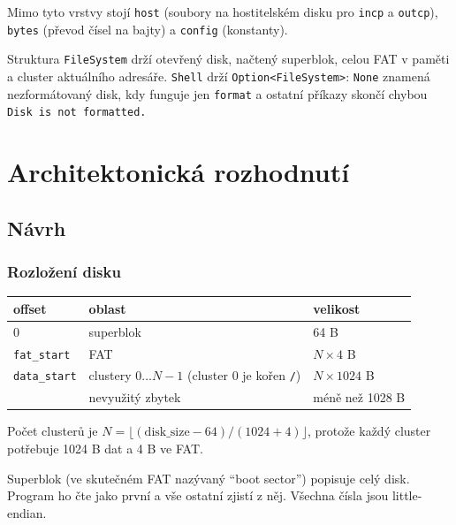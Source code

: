 \documentclass[10pt, a4paper]{report}
\newcommand{\code}[1]{\texttt{#1}}
\begin{document}
	Mimo tyto vrstvy stojí \code{host} (soubory na hostitelském disku pro \code{incp} a
	\code{outcp}), \code{bytes} (převod čísel na bajty) a \code{config} (konstanty).
	
	Struktura \code{FileSystem} drží otevřený disk, načtený superblok, celou FAT v paměti a cluster
	aktuálního adresáře. \code{Shell} drží \code{Option<FileSystem>}: \code{None} znamená
	nezformátovaný disk, kdy funguje jen \code{format} a ostatní příkazy skončí chybou
	\code{Disk is not formatted.}
	
	\chapter{Architektonická rozhodnutí}
	
	\section{Návrh}
	
	\subsection{Rozložení disku}
	
	\begin{table}[H]
		\centering
		\begin{tabular}{|l|l|l|}
			\hline
			\textbf{offset} & \textbf{oblast} & \textbf{velikost} \\ \hline
			0 & superblok & 64 B \\ \hline
			\code{fat\_start} & FAT & $N \times 4$ B \\ \hline
			\code{data\_start} & clustery $0 \dots N-1$ (cluster 0 je kořen \code{/}) & $N \times 1024$ B \\ \hline
			& nevyužitý zbytek & méně než 1028 B \\ \hline
		\end{tabular}
	\end{table}
	
	Počet clusterů je $N = \lfloor (\text{disk\_size} - 64) / (1024 + 4) \rfloor$, protože každý
	cluster potřebuje 1024 B dat a 4 B ve FAT.
	
	Superblok (ve skutečném FAT nazývaný \enquote{boot sector}) popisuje celý disk. Program ho čte jako první
	a vše ostatní zjistí z něj. Všechna čísla jsou little-endian.
	
\end{document}
